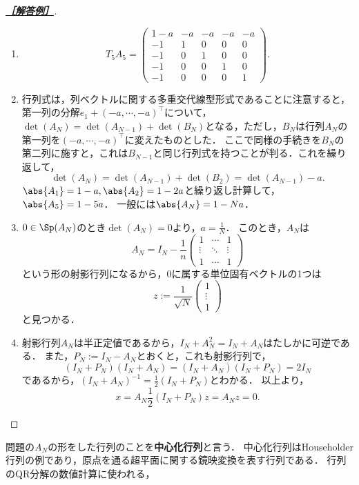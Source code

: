 \documentclass[uplatex,dvipdfmx]{jsarticle}
\begin{document}
\begin{proof}[\textbf{\underline{［解答例］}}]\mbox{}
    \begin{enumerate}
        \item \[T_5A_5=\begin{pmatrix}
            1-a&-a&-a&-a&-a\\
            -1&1&0&0&0\\
            -1&0&1&0&0\\
            -1&0&0&1&0\\
            -1&0&0&0&1
        \end{pmatrix}.\]
        \item 行列式は，列ベクトルに関する多重交代線型形式であることに注意すると，第一列の分解$e_1+(-a,\cdots,-a)^\top$について，$\det(A_N)=\det(A_{N-1})+\det(B_N)$となる，ただし，$B_N$は行列$A_{N}$の第一列を$(-a,\cdots,-a)^{\top}$に変えたものとした．
        ここで同様の手続きを$B_N$の第二列に施すと，これは$B_{N-1}$と同じ行列式を持つことが判る．これを繰り返して，
        \[\det(A_N)=\det(A_{N-1})+\det(B_2)=\det(A_{N-1})-a.\]
        $\abs{A_1}=1-a,\abs{A_2}=1-2a$と繰り返し計算して，$\abs{A_5}=1-5a$．
        一般には$\abs{A_N}=1-Na$．
        \item $0\in\Sp(A_N)$のとき$\det(A_N)=0$より，$a=\frac{1}{N}$．
        このとき，$A_N$は
        \[A_N=I_N-\frac{1}{n}\begin{pmatrix}
            1&\cdots&1\\
            \vdots&\ddots&\vdots\\
            1&\cdots&1
        \end{pmatrix}\]
        という形の射影行列になるから，$0$に属する単位固有ベクトルの1つは
        \[z:=\frac{1}{\sqrt{N}}\begin{pmatrix}
            1\\\vdots\\1
        \end{pmatrix}\]
        と見つかる．
        \item 射影行列$A_N$は半正定値であるから，$I_N+A_N^2=I_N+A_N$はたしかに可逆である．
        また，$P_N:=I_N-A_N$とおくと，これも射影行列で，
        \[(I_N+P_N)(I_N+A_N)=(I_N+A_N)(I_N+P_N)=2I_N\]
        であるから，$(I_N+A_N)^{-1}=\frac{1}{2}(I_N+P_N)$とわかる．
        以上より，
        \[x=A_N\frac{1}{2}(I_N+P_N)z=A_Nz=0.\]
    \end{enumerate}
\end{proof}
\begin{remarks}
    問題の$A_N$の形をした行列のことを\textbf{中心化行列}と言う．
    中心化行列はHouseholder行列の例であり，原点を通る超平面に関する鏡映変換を表す行列である．
    行列のQR分解の数値計算に使われる，
\end{remarks}
\end{document}

